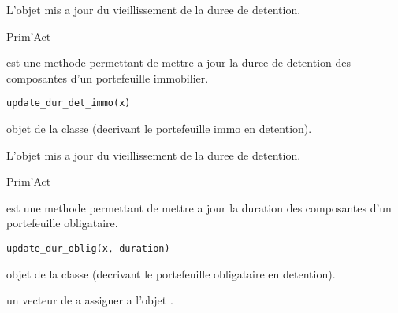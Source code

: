 \documentclass[a4paper]{book}
\begin{document}
%
\begin{Value}
L'objet  mis a jour du vieillissement de la duree de detention.
\end{Value}
%
\begin{Author}\relax
Prim'Act
\end{Author}
%
\begin{Description}\relax
{} est une methode permettant de mettre a jour la duree de detention des composantes d'un portefeuille immobilier.
\end{Description}
%
\begin{Usage}
\begin{verbatim}
update_dur_det_immo(x)
\end{verbatim}
\end{Usage}
%
\begin{Arguments}
\begin{ldescription}
\item[\code{x}] objet de la classe  (decrivant le portefeuille immo en detention).
\end{ldescription}
\end{Arguments}
%
\begin{Value}
L'objet  mis a jour du vieillissement de la duree de detention.
\end{Value}
%
\begin{Author}\relax
Prim'Act
\end{Author}
%
\begin{Description}\relax
{} est une methode permettant de mettre a jour la duration des composantes d'un portefeuille obligataire.
\end{Description}
%
\begin{Usage}
\begin{verbatim}
update_dur_oblig(x, duration)
\end{verbatim}
\end{Usage}
%
\begin{Arguments}
\begin{ldescription}
\item[\code{x}] objet de la classe  (decrivant le portefeuille obligataire en detention).

\item[\code{duration}] un vecteur de  a assigner a l'objet .
\end{ldescription}
\end{Arguments}
\end{document}

